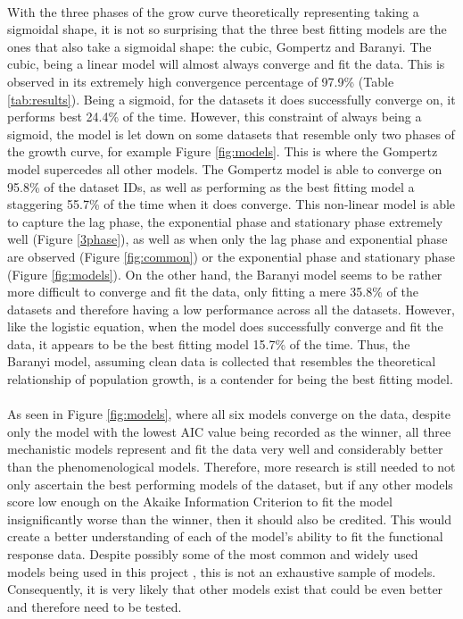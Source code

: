 \documentclass[11pt, a4paper]{article} %
\begin{document}
\paragraph{} With the three phases of the grow curve theoretically representing taking a sigmoidal shape, it is not so surprising that the three best fitting models are the ones that also take a sigmoidal shape: the cubic, Gompertz and Baranyi. The cubic, being a linear model will almost always converge and fit the data. This is observed in its extremely high convergence percentage of 97.9\% (Table \ref{tab:results}). Being a sigmoid, for the datasets it does successfully converge on, it performs best 24.4\% of the time. However, this constraint of always being a sigmoid, the model is let down on some datasets that resemble only two phases of the growth curve, for example Figure \ref{fig:models}. This is where the Gompertz model supercedes all other models. The Gompertz model is able to converge on 95.8\% of the dataset IDs, as well as performing as the best fitting model a staggering 55.7\% of the time when it does converge. This non-linear model is able to capture the lag phase, the exponential phase and stationary phase extremely well (Figure \ref{3phase}), as well as when only the lag phase and exponential phase are observed (Figure \ref{fig:common}) or the exponential phase and stationary phase (Figure \ref{fig:models}). On the other hand, the Baranyi model seems to be rather more difficult to converge and fit the data, only fitting a mere 35.8\% of the datasets and therefore having a low performance across all the datasets. However, like the logistic equation, when the model does successfully converge and fit the data, it appears to be the best fitting model 15.7\% of the time. Thus, the Baranyi model, assuming clean data is collected that resembles the theoretical relationship of population growth, is a contender for being the best fitting model. 
\paragraph{} As seen in Figure \ref{fig:models}, where all six models converge on the data, despite only the model with the lowest AIC value being recorded as the winner, all three mechanistic models represent and fit the data very well and considerably better than the phenomenological models. Therefore, more research is still needed to not only ascertain the best performing models of the dataset, but if any other models score low enough on the Akaike Information Criterion to fit the model insignificantly worse than the winner, then it should also be credited. This would create a better understanding of each of the model's ability to fit the functional response data. Despite possibly some of the most common and widely used models being used in this project \citep{RN108, RN105}, this is not an exhaustive sample of models. Consequently, it is very likely that other models exist that could be even better and therefore need to be tested.
 
\end{document}

